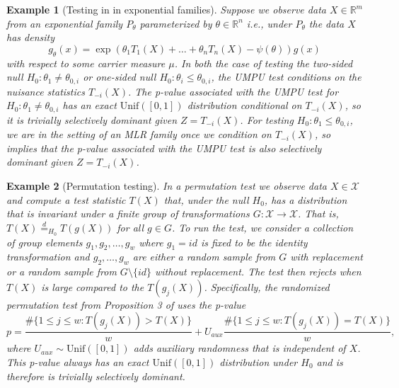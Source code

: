 \documentclass{article}
\newtheorem{example}{Example}
\newcommand{\R}{\mathbb{R}}
\begin{document}
\begin{example}[Testing in in exponential families]
\label{exm:exp_fam}
Suppose we observe data $X \in \R^m$ from an exponential family $P_{\theta}$ parameterized by $\theta \in \R^n$ i.e., under $P_{\theta}$ the data $X$ has density  
\begin{equation*}
    g_{\theta}(x) = \exp( \theta_1 T_1(X) + \dots + \theta_n T_n(X) - \psi(\theta) ) g(x) 
\end{equation*}
with respect to some carrier measure $\mu$. In both the case of testing the two-sided null $H_0: \theta_1 \neq \theta_{0, i}$ or one-sided null $H_0: \theta_i \leq \theta_{0, i}$, the UMPU test conditions on the nuisance statistics $T_{-i}(X)$. The p-value associated with the UMPU test for $H_0: \theta_1 \neq \theta_{0, i}$ has an exact $\text{Unif}([0, 1])$ distribution conditional on $T_{-i}(X)$, so it is trivially selectively dominant given $Z = T_{-i}(X)$. For testing $H_0: \theta_1 \leq \theta_{0, i}$, we are in the setting of an MLR family once we condition on $T_{-i}(X)$, so  implies that the p-value associated with the UMPU test is also selectively dominant given $Z = T_{-i}(X)$.
\end{example}

\begin{example}[Permutation testing]
In a permutation test we observe data $X \in \mathcal{X}$ and compute a test statistic $T(X)$ that, under the null $H_0$, has a distribution that is invariant under a finite group of transformations $G : \mathcal{X} \rightarrow \mathcal{X}$. That is, $T(X) \overset{d}{=}_{H_0} T(g(X))$ for all $ g \in G$. To run the test, we consider a collection of group elements $g_1, g_2, \dots, g_w$ where $g_1 = id$ is fixed to be the identity transformation and $g_2, \dots, g_w$ are either a random sample from $G$ with replacement or a random sample from $G \setminus \{id \}$ without replacement. The test then rejects when $T(X)$ is large compared to the $T(g_j(X))$. Specifically, the randomized permutation test from Proposition 3 of \cite{Hemerik} uses the p-value
\begin{equation*}
    p = \frac{\#\{1 \leq j \leq w : T(g_j(X)) > T(X) \}}{w} + U_{aux} \frac{\#\{1 \leq j \leq w : T(g_j(X)) = T(X) \}}{w},
\end{equation*}
where $U_{aux} \sim \text{Unif}([0, 1])$ adds auxiliary randomness that is independent of $X$. This p-value always has an exact $\text{Unif}([0, 1])$ distribution under $H_0$ and is therefore is trivially selectively dominant. 
\end{example}
\end{document}
